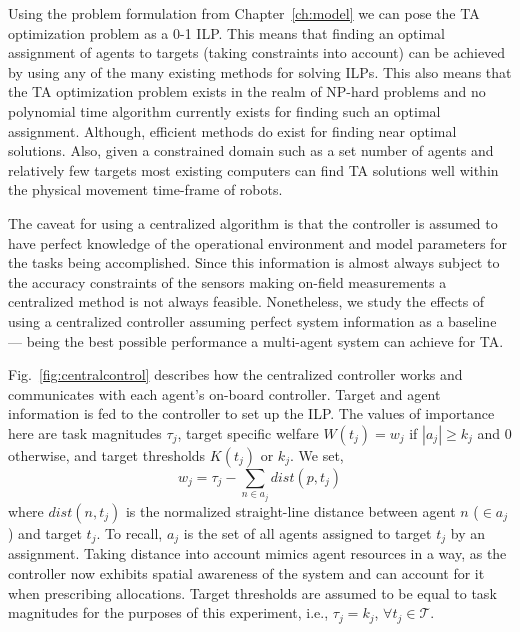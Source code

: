 \documentclass[12pt]{book}
\newcommand{\Ta}{\mathcal{T}} %
\begin{document}
Using the problem formulation from Chapter~\ref{ch:model} we can pose the TA optimization problem as a 0-1 ILP. This means that finding an optimal assignment of agents to targets (taking constraints into account) can be achieved by using any of the many existing methods for solving ILPs. This also means that the TA optimization problem exists in the realm of NP-hard problems and no polynomial time algorithm currently exists for finding such an optimal assignment. Although, efficient methods do exist for finding near optimal solutions. Also, given a constrained domain such as a set number of agents and relatively few targets most existing computers can find TA solutions well within the physical movement time-frame of robots. 

The caveat for using a centralized algorithm is that the controller is assumed to have perfect knowledge of the operational environment and model parameters for the tasks being accomplished. Since this information is almost always subject to the accuracy constraints of the sensors making on-field measurements a centralized method is not always feasible. Nonetheless, we study the effects of using a centralized controller assuming perfect system information as a baseline --- being the best possible performance a multi-agent system can achieve for TA.

Fig.~\ref{fig:centralcontrol} describes how the centralized controller works and communicates with each agent's on-board controller. Target and agent information is fed to the controller to set up the ILP. The values of importance here are task magnitudes $\tau_j$, target specific welfare $W(t_j) = w_j$ if $|a_j| \geq k_j$ and $0$ otherwise, and target thresholds $K(t_j)$ or $k_j$. We set,
\begin{equation*}
	w_j = \tau_j - \sum\limits_{n \in a_j} dist(p, t_j)
\end{equation*}
where $dist(n,t_j)$ is the normalized straight-line distance between agent $n$ ($\in a_j$) and target $t_j$. To recall, $a_j$ is the set of all agents assigned to target $t_j$ by an assignment. Taking distance into account mimics agent resources in a way, as the controller now exhibits spatial awareness of the system and can account for it when prescribing allocations. Target thresholds are assumed to be equal to task magnitudes for the purposes of this experiment, i.e., $\tau_j = k_j$, $\forall t_j \in \Ta$. 
\end{document}
